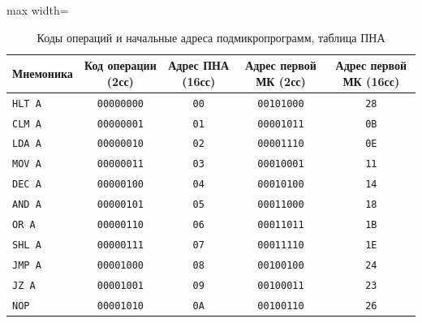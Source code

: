 \documentclass[11pt, a4paper]{article}
\begin{document}
\begin{table}[h!]
	\centering
	\caption{Коды операций и начальные адреса подмикропрограмм, таблица ПНА}
	\begin{adjustbox}{max width=\textwidth}
	\begin{tabular}{|l|c|c|c|c|}
		\hline
		\textbf{Мнемоника} & \textbf{Код операции (2сс)} & \textbf{Адрес ПНА (16сс)} & \textbf{Адрес первой МК (2сс)} & \textbf{Адрес первой МК (16сс)} \\
		\hline
		\texttt{HLT A}     & \texttt{00000000}           & \texttt{00}               & \texttt{00101000}              & \texttt{28}                     \\
		\texttt{CLM A}     & \texttt{00000001}           & \texttt{01}               & \texttt{00001011}              & \texttt{0B}                     \\
		\texttt{LDA A}     & \texttt{00000010}           & \texttt{02}               & \texttt{00001110}              & \texttt{0E}                     \\
		\texttt{MOV A}     & \texttt{00000011}           & \texttt{03}               & \texttt{00010001}              & \texttt{11}                     \\
		\texttt{DEC A}     & \texttt{00000100}           & \texttt{04}               & \texttt{00010100}              & \texttt{14}                     \\
		\texttt{AND A}     & \texttt{00000101}           & \texttt{05}               & \texttt{00011000}              & \texttt{18}                     \\
		\texttt{OR A}      & \texttt{00000110}           & \texttt{06}               & \texttt{00011011}              & \texttt{1B}                     \\
		\texttt{SHL A}     & \texttt{00000111}           & \texttt{07}               & \texttt{00011110}              & \texttt{1E}                     \\
		\texttt{JMP A}     & \texttt{00001000}           & \texttt{08}               & \texttt{00100100}              & \texttt{24}                     \\
		\texttt{JZ A}      & \texttt{00001001}           & \texttt{09}               & \texttt{00100011}              & \texttt{23}                     \\
		\texttt{NOP}       & \texttt{00001010}           & \texttt{0A}               & \texttt{00100110}              & \texttt{26}                     \\
		\hline
	\end{tabular}
	\end{adjustbox}
\end{table}
\end{document}
